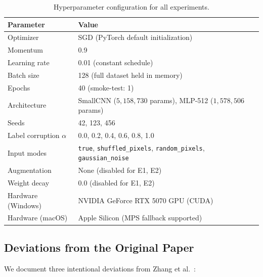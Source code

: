 \documentclass[12pt,a4paper]{article}
\theoremstyle{definition}
\theoremstyle{remark}
\begin{document}
\begin{table}[h]
  \centering
  \caption{Hyperparameter configuration for all experiments.}
  \label{tab:hparams}
  \begin{tabular}{ll}
    \toprule
    \textbf{Parameter} & \textbf{Value} \\
    \midrule
    Optimizer          & SGD (PyTorch default initialization) \\
    Momentum           & 0.9 \\
    Learning rate      & 0.01 (constant schedule) \\
    Batch size         & 128 (full dataset held in memory) \\
    Epochs             & 40 (smoke-test: 1) \\
    Architecture       & SmallCNN ($5{,}158{,}730$ params), MLP-512 ($1{,}578{,}506$ params) \\
    Seeds              & 42, 123, 456 \\
    Label corruption $\alpha$ & 0.0, 0.2, 0.4, 0.6, 0.8, 1.0 \\
    Input modes        & \texttt{true}, \texttt{shuffled\_pixels},
                         \texttt{random\_pixels}, \texttt{gaussian\_noise} \\
    Augmentation       & None (disabled for E1, E2) \\
    Weight decay       & 0.0 (disabled for E1, E2) \\
    \midrule
    Hardware (Windows) & NVIDIA GeForce RTX 5070 GPU (CUDA) \\
    Hardware (macOS)   & Apple Silicon (MPS fallback supported) \\
    \bottomrule
  \end{tabular}
\end{table}

\subsection{Deviations from the Original Paper}

We document three intentional deviations from Zhang et al.~\cite{zhang2017understanding}:
\end{document}
